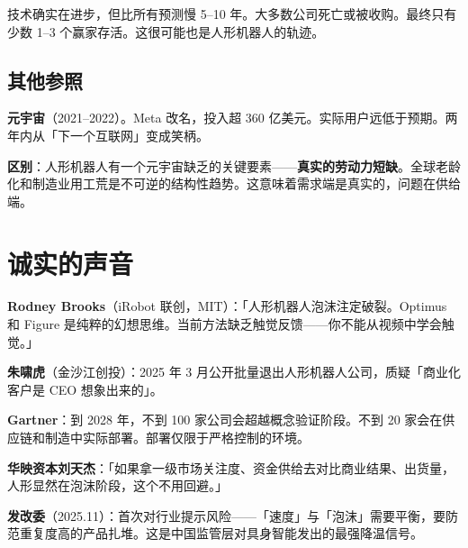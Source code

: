 \begin{corebox}[自动驾驶的教训]
技术确实在进步，但比所有预测慢 5--10 年。大多数公司死亡或被收购。最终只有少数 1--3 个赢家存活。这很可能也是人形机器人的轨迹。
\end{corebox}

\subsection{其他参照}

\textbf{元宇宙}（2021--2022）。Meta 改名，投入超 360 亿美元。实际用户远低于预期。两年内从「下一个互联网」变成笑柄。

\textbf{区别}：人形机器人有一个元宇宙缺乏的关键要素——\textbf{真实的劳动力短缺}。全球老龄化和制造业用工荒是不可逆的结构性趋势。这意味着需求端是真实的，问题在供给端。

\section{诚实的声音}

\textbf{Rodney Brooks}（iRobot 联创，MIT）\cite{brooks2025dexterity}：「人形机器人泡沫注定破裂。Optimus 和 Figure 是纯粹的幻想思维。当前方法缺乏触觉反馈——你不能从视频中学会触觉。」

\textbf{朱啸虎}（金沙江创投）\cite{zhuxiaohu2025exit}：2025 年 3 月公开批量退出人形机器人公司，质疑「商业化客户是 CEO 想象出来的」。

\textbf{Gartner}\cite{gartner2026humanoid}：到 2028 年，不到 100 家公司会超越概念验证阶段。不到 20 家会在供应链和制造中实际部署。部署仅限于严格控制的环境。

\textbf{华映资本刘天杰}\cite{huaying2026bubble}：「如果拿一级市场关注度、资金供给去对比商业结果、出货量，人形显然在泡沫阶段，这个不用回避。」

\textbf{发改委}（2025.11）\cite{ndrc2025warning}：首次对行业提示风险——「速度」与「泡沫」需要平衡，要防范重复度高的产品扎堆。这是中国监管层对具身智能发出的最强降温信号。
